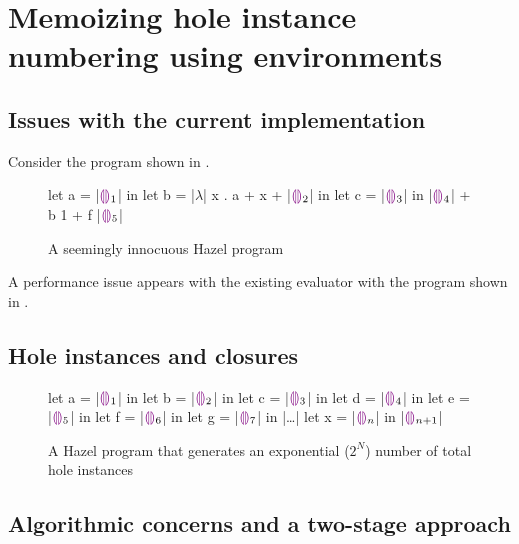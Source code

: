 \section{Memoizing hole instance numbering using environments}
\label{sec:renumbering}

\subsection{Issues with the current implementation}
\label{sec:current_problems}

Consider the program shown in .

\begin{figure}
  \centering
  \begin{hminted}
let a = |$\hehole_1$| in
let b = |$\lambda$| x . { a + x + |$\hehole_2$| } in
let c = |$\hehole_3$| in
|$\hehole_4$| + b 1 + f |$\hehole_5$|
  \end{hminted}
  \caption{A seemingly innocuous Hazel program}
  \label{fig:sample_hazel_program}
\end{figure}

A performance issue appears with the existing evaluator with the program shown in .



\subsection{Hole instances and closures}
\label{sec:hole_instances_and_closures}

\begin{figure}
  \centering
  \begin{hminted}
let a = |$\hehole_1$| in
let b = |$\hehole_2$| in
let c = |$\hehole_3$| in
let d = |$\hehole_4$| in
let e = |$\hehole_5$| in
let f = |$\hehole_6$| in
let g = |$\hehole_7$| in
|\dots|
let x = |$\hehole_{n}$| in
|$\hehole_{n+1}$|
  \end{hminted}
  \caption{A Hazel program that generates an exponential ($2^N$) number of total hole instances}
  \label{fig:hole_renumbering_problem}
\end{figure}

\subsection{Algorithmic concerns and a two-stage approach}
\label{sec:two-stage-renumber}

